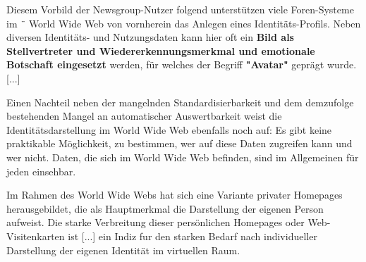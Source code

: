 \vspace{0.3cm}


\begin{Zitat}[Avatar]

Diesem Vorbild der Newsgroup-Nutzer folgend unterstützen viele Foren-Systeme im ¨
World Wide Web von vornherein das Anlegen eines Identitäts-Profils. Neben diversen
Identitäts- und Nutzungsdaten kann hier oft ein \textbf{Bild als Stellvertreter und Wiedererkennungsmerkmal und emotionale Botschaft eingesetzt} werden, für welches der Begriff \textbf{"Avatar"} geprägt wurde. [...]

Einen Nachteil neben der mangelnden
Standardisierbarkeit und dem demzufolge bestehenden Mangel an automatischer Auswertbarkeit weist die Identitätsdarstellung im World Wide Web ebenfalls noch auf: Es
gibt keine praktikable Möglichkeit, zu bestimmen, wer auf diese Daten zugreifen kann
und wer nicht. Daten, die sich im World Wide Web befinden, sind im Allgemeinen für jeden einsehbar. 

\end{Zitat}

\vspace{0.3cm}


\begin{Zitat}

Im Rahmen des World Wide Webs hat sich eine Variante privater Homepages herausgebildet, die als Hauptmerkmal die Darstellung der eigenen Person aufweist. Die
starke Verbreitung dieser persönlichen Homepages oder Web-Visitenkarten ist [...] ein Indiz fur den starken Bedarf nach individueller Darstellung der eigenen Identität im virtuellen Raum.

\end{Zitat}

\vspace{0.3cm}


